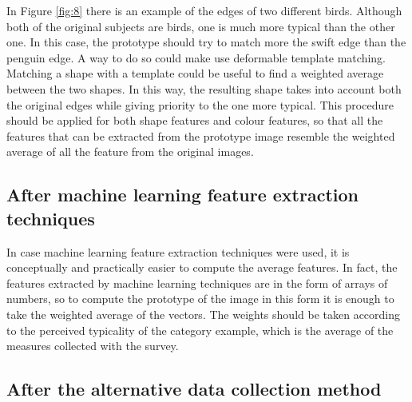 \documentclass[conference]{IEEEtran}
\begin{document}
		\noindent In Figure \ref{fig:8} there is an example of the edges of two different birds. Although both of the original 
		subjects are birds, one is much more typical than the other one. In this case, the prototype should try to match more the swift edge than the penguin edge. A way to do so could make use deformable 
		template matching. Matching a shape with a template could be useful to find a weighted average between the two shapes. In this way, the resulting shape takes into account both the original edges while 
		giving priority to the one more typical.
		This procedure should be applied for both shape features and colour features, so that all the features that can be extracted from the prototype image resemble the weighted average of all the feature from 
		the original images. 

		\subsection{After machine learning feature extraction techniques\label{sec:mlfet}}
		
			\noindent In case machine learning feature extraction techniques were used, it is conceptually and practically easier to compute the average features. In fact, the features extracted by machine learning techniques are 
			in the form of arrays of numbers, so to compute the prototype of the image in this form it is enough to take the weighted average of the vectors. The weights should be taken according to the perceived typicality 
			of the category example, which is the average of the measures collected with the survey.
			
		\subsection{After the alternative data collection method}
		
\end{document}
